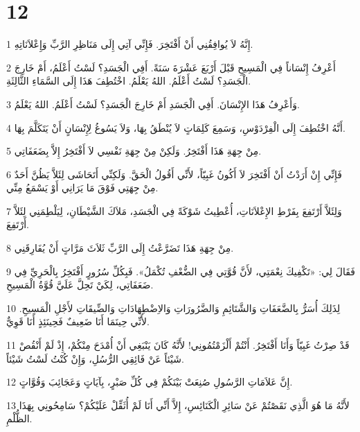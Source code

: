\chapter{12}

\par 1 إِنَّهُ لاَ يُوافِقُنِي أَنْ أَفْتَخِرَ. فَإِنِّي آتِي إِلَى مَنَاظِرِ الرَّبِّ وَإِعْلاَنَاتِهِ.
\par 2 أَعْرِفُ إِنْسَاناً فِي الْمَسِيحِ قَبْلَ أَرْبَعَ عَشْرَةَ سَنَةً. أَفِي الْجَسَدِ؟ لَسْتُ أَعْلَمُ، أَمْ خَارِجَ الْجَسَدِ؟ لَسْتُ أَعْلَمُ. اللهُ يَعْلَمُ. اخْتُطِفَ هَذَا إِلَى السَّمَاءِ الثَّالِثَةِ.
\par 3 وَأَعْرِفُ هَذَا الإِنْسَانَ. أَفِي الْجَسَدِ أَمْ خَارِجَ الْجَسَدِ؟ لَسْتُ أَعْلَمُ. اللهُ يَعْلَمُ.
\par 4 أَنَّهُ اخْتُطِفَ إِلَى الْفِرْدَوْسِ، وَسَمِعَ كَلِمَاتٍ لاَ يُنْطَقُ بِهَا، وَلاَ يَسُوغُ لِإِنْسَانٍ أَنْ يَتَكَلَّمَ بِهَا.
\par 5 مِنْ جِهَةِ هَذَا أَفْتَخِرُ. وَلَكِنْ مِنْ جِهَةِ نَفْسِي لاَ أَفْتَخِرُ إِلاَّ بِضَعَفَاتِي.
\par 6 فَإِنِّي إِنْ أَرَدْتُ أَنْ أَفْتَخِرَ لاَ أَكُونُ غَبِيّاً، لأَنِّي أَقُولُ الْحَقَّ. وَلَكِنِّي أَتَحَاشَى لِئَلاَّ يَظُنَّ أَحَدٌ مِنْ جِهَتِي فَوْقَ مَا يَرَانِي أَوْ يَسْمَعُ مِنِّي.
\par 7 وَلِئَلاَّ أَرْتَفِعَ بِفَرْطِ الإِعْلاَنَاتِ، أُعْطِيتُ شَوْكَةً فِي الْجَسَدِ، مَلاَكَ الشَّيْطَانِ، لِيَلْطِمَنِي لِئَلاَّ أَرْتَفِعَ.
\par 8 مِنْ جِهَةِ هَذَا تَضَرَّعْتُ إِلَى الرَّبِّ ثَلاَثَ مَرَّاتٍ أَنْ يُفَارِقَنِي.
\par 9 فَقَالَ لِي: «تَكْفِيكَ نِعْمَتِي، لأَنَّ قُوَّتِي فِي الضُّعْفِ تُكْمَلُ». فَبِكُلِّ سُرُورٍ أَفْتَخِرُ بِالْحَرِيِّ فِي ضَعَفَاتِي، لِكَيْ تَحِلَّ عَلَيَّ قُوَّةُ الْمَسِيحِ.
\par 10 لِذَلِكَ أُسَرُّ بِالضَّعَفَاتِ وَالشَّتَائِمِ وَالضَّرُورَاتِ وَالاِضْطِهَادَاتِ وَالضِّيقَاتِ لأَجْلِ الْمَسِيحِ. لأَنِّي حِينَمَا أَنَا ضَعِيفٌ فَحِينَئِذٍ أَنَا قَوِيٌّ.
\par 11 قَدْ صِرْتُ غَبِيّاً وَأَنَا أَفْتَخِرُ. أَنْتُمْ أَلْزَمْتُمُونِي! لأَنَّهُ كَانَ يَنْبَغِي أَنْ أُمْدَحَ مِنْكُمْ، إِذْ لَمْ أَنْقُصْ شَيْئاً عَنْ فَائِقِي الرُّسُلِ، وَإِنْ كُنْتُ لَسْتُ شَيْئاً.
\par 12 إِنَّ عَلاَمَاتِ الرَّسُولِ صُنِعَتْ بَيْنَكُمْ فِي كُلِّ صَبْرٍ، بِآيَاتٍ وَعَجَائِبَ وَقُوَّاتٍ.
\par 13 لأَنَّهُ مَا هُوَ الَّذِي نَقَصْتُمْ عَنْ سَائِرِ الْكَنَائِسِ، إِلاَّ أَنِّي أَنَا لَمْ أُثَقِّلْ عَلَيْكُمْ؟ سَامِحُونِي بِهَذَا الظُّلْمِ.
